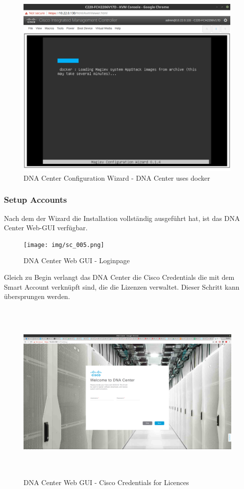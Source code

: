 \begin{figure}[H]
	\centering
	\includegraphics[height=9cm]{img/sc_004.png}
	\caption{DNA Center Configuration Wizard - DNA Center uses docker}
	\label{fig:dna-center-install-step-install}
\end{figure}


\subsubsection{Setup Accounts}
Nach dem der Wizard die Installation vollständig ausgeführt hat, ist das DNA Center Web-GUI verfügbar.
\begin{figure}[H]
	\centering
	\texttt{[image: img/sc\_005.png]}
	\caption{DNA Center Web GUI - Loginpage}
	\label{fig:dna-center-gui-1}
\end{figure}

Gleich zu Begin verlangt das DNA Center die Cisco Credentials die mit dem Smart Account verknüpft sind, die die Lizenzen verwaltet. Dieser Schritt kann übersprungen werden. 

\begin{figure}[H]
	\centering
	\includegraphics[height=9cm]{img/sc_006.png}
	\caption{DNA Center Web GUI - Cisco Credentials for Licences}
	\label{fig:dna-center-gui-2}
\end{figure}

